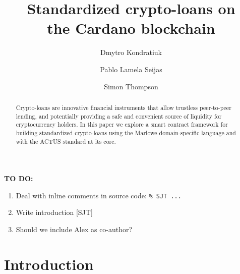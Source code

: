 \documentclass[runningheads]{llncs}
\begin{document}
\title{Standardized crypto-loans on\\ the Cardano blockchain}%


\author{Dmytro Kondratiuk \and
				Pablo {Lamela Seijas} \and
                Simon Thompson}





%
\maketitle              %
%
\begin{abstract}
Crypto-loans are %
innovative financial instruments that
allow trustless peer-to-peer %
lending, and potentially providing a safe and convenient
source of liquidity for cryptocurrency holders. In this paper we
explore a smart contract framework for building standardized crypto-loans
using the Marlowe domain-specific language and with the ACTUS standard at its core.

\end{abstract}



\textbf{TO DO:}
\begin{enumerate}
\item
Deal with inline comments in source code: \verb+% SJT ...+
\item
Write introduction [SJT]
\item
Should we include Alex as co-author?
\end{enumerate}


\section{Introduction}
\end{document}
